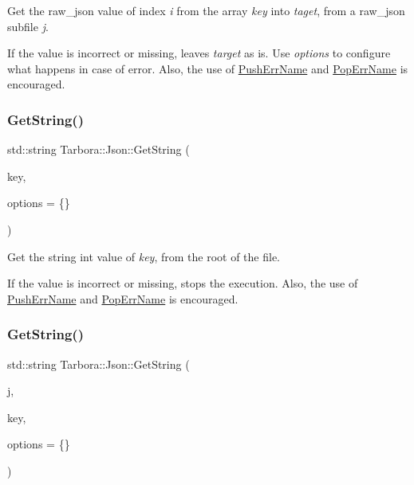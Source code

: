 Get the raw\+\_\+json value of index {\itshape i} from the array {\itshape key} into {\itshape taget}, from a raw\+\_\+json subfile {\itshape j}. 

If the value is incorrect or missing, leaves {\itshape target} as is. Use {\itshape options} to configure what happens in case of error. Also, the use of \hyperlink{classTarbora_1_1Json_a061eac4f16dac3b9b3a26a66de0ea8f0}{Push\+Err\+Name} and \hyperlink{classTarbora_1_1Json_a14019f06d3bd76edd6a6e78134519d11}{Pop\+Err\+Name} is encouraged. \mbox{\label{classTarbora_1_1Json_a0d99980482afa0e1f51ff5603d626335}} 
\subsubsection{\texorpdfstring{Get\+String()}{GetString()}\hspace{0.1cm}{\footnotesize\ttfamily [1/3]}}
{\footnotesize\ttfamily std\+::string Tarbora\+::\+Json\+::\+Get\+String (\begin{DoxyParamCaption}\item[{const char $\ast$}]{key,  }\item[{\hyperlink{structTarbora_1_1JsonOptions}{Json\+Options}}]{options = {\ttfamily \{\}} }\end{DoxyParamCaption})}



Get the string int value of {\itshape key}, from the root of the file. 

If the value is incorrect or missing, stops the execution. Also, the use of \hyperlink{classTarbora_1_1Json_a061eac4f16dac3b9b3a26a66de0ea8f0}{Push\+Err\+Name} and \hyperlink{classTarbora_1_1Json_a14019f06d3bd76edd6a6e78134519d11}{Pop\+Err\+Name} is encouraged. \mbox{\label{classTarbora_1_1Json_ad8bd8296d4c402db6d6607ade20652c7}} 
\subsubsection{\texorpdfstring{Get\+String()}{GetString()}\hspace{0.1cm}{\footnotesize\ttfamily [2/3]}}
{\footnotesize\ttfamily std\+::string Tarbora\+::\+Json\+::\+Get\+String (\begin{DoxyParamCaption}\item[{raw\+\_\+json}]{j,  }\item[{const char $\ast$}]{key,  }\item[{\hyperlink{structTarbora_1_1JsonOptions}{Json\+Options}}]{options = {\ttfamily \{\}} }\end{DoxyParamCaption})}



